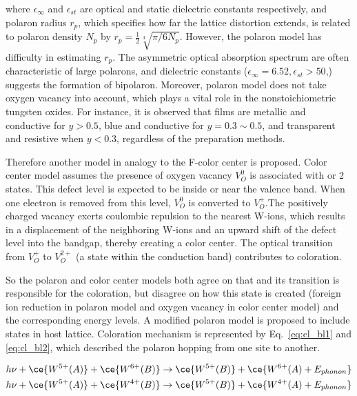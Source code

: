 where $\epsilon_\infty$ and $\epsilon_{st}$ are optical and static dielectric constants respectively, and polaron radius $r_p$, which specifies how far the lattice distortion extends, is related to polaron density $N_p$ by $r_p = \frac{1}{2}\sqrt[3]{\pi/6N_p}$. However, the polaron model has difficulty in estimating $r_p$. The asymmetric optical absorption spectrum are often characteristic of large polarons, and dielectric constants ($\epsilon_\infty = 6.52,\epsilon_{st} > 50$,\cite{Deb2008}) suggests the formation of bipolaron. Moreover, polaron model does not take oxygen vacancy into account, which plays a vital role in the nonstoichiometric tungsten oxides. For instance, it is observed that  films are metallic and conductive for $y > 0.5$, blue and conductive for $y = 0.3 \sim 0.5$, and transparent and resistive when $y < 0.3$, regardless of the preparation methods.\cite{Chatten2005}

Therefore another model in analogy to the F-color center is proposed. Color center model assumes the presence of oxygen vacancy $V_O^0$ is associated with  or 2 states. This defect level is expected to be inside or near the valence band. When one electron is removed from this level, $V_O^0$ is converted to $V_O^+$.The positively charged vacancy exerts coulombic repulsion to the nearest W-ions, which results in a displacement of the neighboring W-ions and an upward shift of the defect level into the bandgap, thereby creating a color center. The optical transition from $V_O^+$ to $V_O^{2+}$ (a state within the conduction band)
contributes to coloration.\cite{Deb2008}

So the polaron and color center models both agree on that  and its transition is responsible for the coloration, but disagree on how this  state is created (foreign ion reduction in polaron model and oxygen vacancy in color center model) and the corresponding energy levels. A modified polaron model is proposed to include  states in host lattice. Coloration mechanism is represented by Eq.~\ref{eq:cl_bl1} and \ref{eq:cl_bl2}, which described the polaron hopping from one site to another.\cite{Chatten2005}

\begin{align}
h\nu +\ce{W^{5+}(A)} +  \ce{W^{6+}(B)} &\rightarrow \ce{W^{5+}(B)} + \ce{W^{6+}(A) + E_{phonon}} \label{eq:cl_bl1}\\
h\nu +\ce{W^{5+}(A)} +  \ce{W^{4+}(B)} &\rightarrow \ce{W^{5+}(B)} + \ce{W^{4+}(A) + E_{phonon}} \label{eq:cl_bl2}
\end{align}

